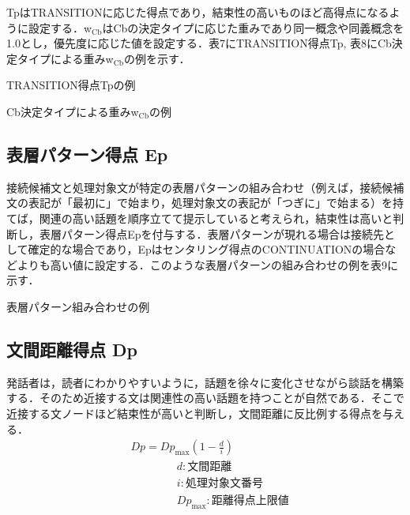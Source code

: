 \documentclass[japanese]{jnlp_1.4}
\begin{document}
TpはTRANSITIONに応じた得点であり，結束性の高いものほど高得点になるように設定する．w$_\mathrm{Cb}$はCbの決定タイプに応じた重みであり同一概念や同義概念を1.0とし，優先度に応じた値を設定する．表7にTRANSITION得点Tp, 表8にCb決定タイプによる重みw$_\mathrm{Cb}$の例を示す．

\begin{table}[b]
\caption{TRANSITION得点Tpの例}

\end{table}
\begin{table}[b]
\caption{Cb決定タイプによる重みw$_\mathrm{Cb}$の例}

\end{table}


\subsection{表層パターン得点 Ep}
\label{sec:mylabel11}

接続候補文と処理対象文が特定の表層パターンの組み合わせ（例えば，接続候補文の表記が「最初に」で始まり，処理対象文の表記が「つぎに」で始まる）を持てば，関連の高い話題を順序立てて提示していると考えられ，結束性は高いと判断し，表層パターン得点Epを付与する．表層パターンが現れる場合は接続先として確定的な場合であり，Epはセンタリング得点のCONTINUATIONの場合などよりも高い値に設定する．このような表層パターンの組み合わせの例を表9に示す．

\begin{table}[t]
\caption{表層パターン組み合わせの例}

\end{table}


\subsection{文間距離得点 Dp}
\label{sec:mylabel12}

発話者は，読者にわかりやすいように，話題を徐々に変化させながら談話を構築する．そのため近接する文は関連性の高い話題を持つことが自然である．そこで近接する文ノードほど結束性が高いと判断し，文間距離に反比例する得点を与える．
\begin{align}
 & Dp = Dp_{\max} \left(1-\frac{d}{i}\right) \\ 
 & \hspace{50pt} d: 文間距離 \nonumber\\ 
 & \hspace{50pt} i: 処理対象文番号 \nonumber\\
 & \hspace{50pt} Dp_{\max}: 距離得点上限値 \nonumber
\end{align}
\end{document}
